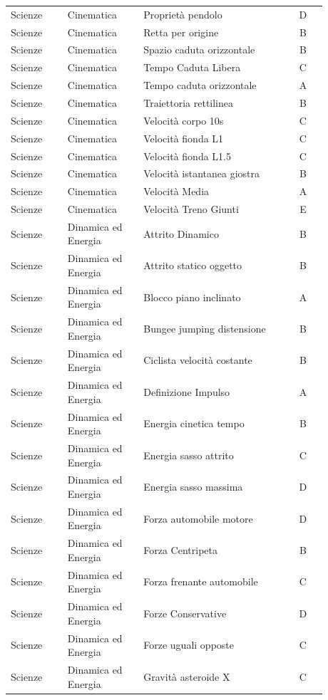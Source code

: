 \documentclass[20pt, a4paper]{article}
\begin{document}
\begin{longtable}{@{}>{\raggedright\arraybackslash}p{0.18\linewidth}>{\raggedright\arraybackslash}p{0.24\linewidth}>{\raggedright\arraybackslash}p{0.46\linewidth}c@{}}
Scienze & Cinematica & Proprietà pendolo & D \\
Scienze & Cinematica & Retta per origine & B \\
Scienze & Cinematica & Spazio caduta orizzontale & B \\
Scienze & Cinematica & Tempo Caduta Libera & C \\
Scienze & Cinematica & Tempo caduta orizzontale & A \\
Scienze & Cinematica & Traiettoria rettilinea & B \\
Scienze & Cinematica & Velocità corpo 10s & C \\
Scienze & Cinematica & Velocità fionda L1 & C \\
Scienze & Cinematica & Velocità fionda L1.5 & C \\
Scienze & Cinematica & Velocità istantanea giostra & B \\
Scienze & Cinematica & Velocità Media & A \\
Scienze & Cinematica & Velocità Treno Giunti & E \\
Scienze & Dinamica ed Energia & Attrito Dinamico & B \\
Scienze & Dinamica ed Energia & Attrito statico oggetto & B \\
Scienze & Dinamica ed Energia & Blocco piano inclinato & A \\
Scienze & Dinamica ed Energia & Bungee jumping distensione & B \\
Scienze & Dinamica ed Energia & Ciclista velocità costante & B \\
Scienze & Dinamica ed Energia & Definizione Impulso & A \\
Scienze & Dinamica ed Energia & Energia cinetica tempo & B \\
Scienze & Dinamica ed Energia & Energia sasso attrito & C \\
Scienze & Dinamica ed Energia & Energia sasso massima & D \\
Scienze & Dinamica ed Energia & Forza automobile motore & D \\
Scienze & Dinamica ed Energia & Forza Centripeta & B \\
Scienze & Dinamica ed Energia & Forza frenante automobile & C \\
Scienze & Dinamica ed Energia & Forze Conservative & D \\
Scienze & Dinamica ed Energia & Forze uguali opposte & C \\
Scienze & Dinamica ed Energia & Gravità asteroide X & C \\

\end{longtable}
\end{document}
